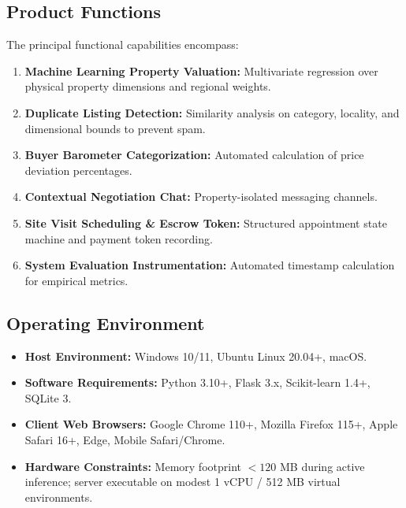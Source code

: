 \documentclass[11pt,a4paper]{article}
\begin{document}
\subsection{Product Functions}
The principal functional capabilities encompass:
\begin{enumerate}[leftmargin=0.8cm]
    \item \textbf{Machine Learning Property Valuation:} Multivariate regression over physical property dimensions and regional weights.
    \item \textbf{Duplicate Listing Detection:} Similarity analysis on category, locality, and dimensional bounds to prevent spam.
    \item \textbf{Buyer Barometer Categorization:} Automated calculation of price deviation percentages.
    \item \textbf{Contextual Negotiation Chat:} Property-isolated messaging channels.
    \item \textbf{Site Visit Scheduling \& Escrow Token:} Structured appointment state machine and payment token recording.
    \item \textbf{System Evaluation Instrumentation:} Automated timestamp calculation for empirical metrics.
\end{enumerate}

\subsection{Operating Environment}
\begin{itemize}[leftmargin=0.8cm]
    \item \textbf{Host Environment:} Windows 10/11, Ubuntu Linux 20.04+, macOS.
    \item \textbf{Software Requirements:} Python 3.10+, Flask 3.x, Scikit-learn 1.4+, SQLite 3.
    \item \textbf{Client Web Browsers:} Google Chrome 110+, Mozilla Firefox 115+, Apple Safari 16+, Edge, Mobile Safari/Chrome.
    \item \textbf{Hardware Constraints:} Memory footprint $< 120$ MB during active inference; server executable on modest 1 vCPU / 512 MB virtual environments.
\end{itemize}
\end{document}
